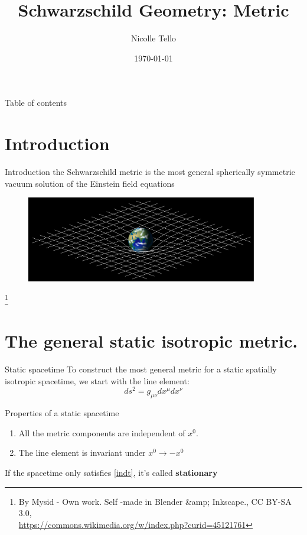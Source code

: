 \documentclass[xcolor=dvipsnames]{beamer}
\title[Schwarzschild geometry]{Schwarzschild Geometry: Metric}
\date{\today}
\author[Universidad del Valle]{Nicolle Tello}
\institute[]{Universidad del Valle \\ Departamento de física}
\begin{document}
	
	\begin{frame}[plain]
		\titlepage
	\end{frame}
	
	\begin{frame}{Table of contents}
    \tableofcontents
	\end{frame}
	
\section{Introduction}	
	\begin{frame}{Introduction}
	the Schwarzschild metric is the most general spherically symmetric vacuum solution of the Einstein field equations
	    \begin{figure}
    \centering
    \includegraphics[width=0.9\textwidth]{Presentations/Images/1_Spacetime_lattice_analogy.svg.png}
\end{figure}
\let\thefootnote\relax\footnote{\tiny By Mysid - Own work. Self -made in Blender &amp; Inkscape., CC BY-SA 3.0,  \\ \hspace{0.25in}\url{https://commons.wikimedia.org/w/index.php?curid=45121761} }
	\end{frame}
\section{The general static isotropic metric.}

    
\begin{frame}{Static spacetime}
To construct the most general metric for a static spatially isotropic spacetime, we start with the line element:
$$ds^2=g_{\mu\nu}dx^{\mu}dx^{\nu}$$
    \begin{block}{Properties of a static spacetime}
    \begin{enumerate}
        \item\label{indt} All the metric components are independent of $x^0$.
        \item The line element is invariant under $x^0 \rightarrow -x^0$
    \end{enumerate}
    \end{block}
    \begin{exampleblock}{}
    If the spacetime only satisfies \ref{indt}, it's called \textbf{stationary}
    \end{exampleblock}
\end{frame}
\end{document}
